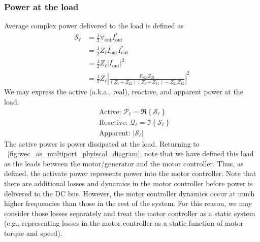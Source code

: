 \documentclass[lettersize,journal]{IEEEtran}
\begin{document}
\subsubsection{Power at the load}\label{sec:power_at_the_load}
Average complex power delivered to the load is defined as 
\begin{equation}
\begin{aligned}
        \mathcal{S}_{\ell} 
        &= \frac{1}{2} \forall_{\textrm{out}} I_{\textrm{out}}^* \\
        &= \frac{1}{2} Z_\ell I_{\textrm{out}} I_{\textrm{out}}^* \\
        &= \frac{1}{2} Z_\ell | I_{\textrm{out}} |^2 \\
        &= \frac{1}{2} Z_\ell \left| \frac{F_{\textrm{exc}} Z_{21}}{ (Z_\ell + Z_{22}) (Z_i + Z_{11}) - Z_{21} Z_{12}  } \right|^2 
\end{aligned}
\end{equation}
%
We may express the active (a.k.a., real), reactive, and apparent power at the load.
%
\begin{subequations}
\begin{align}
        &\textrm{Active: } \mathcal{P}_{\ell} = \Re \left\{ \mathcal{S}_{\ell} \right\} \\[0.5em]
        &\textrm{Reactive: } \mathcal{Q}_{\ell} = \Im \left\{ \mathcal{S}_{\ell} \right\} \\[0.5em]
        &\textrm{Apparent: } | \mathcal{S}_{\ell} |
\end{align}\label{eq:load_power_types}%
\end{subequations}
%
The active power is power dissipated at the load.
Returning to \figurename~\ref{fig:wec_as_multiport_phyiscal_diagram}, note that we have defined this load as the leads between the motor/generator and the motor controller.
Thus, as defined, the activate power represents power into the motor controller.
Note that there are additional losses and dynamics in the motor controller before power is delivered to the DC bus.
However, the motor controller dynamics occur at much higher frequencies than those in the rest of the system.
For this reason, we may consider those losses separately and treat the motor controller as a static system (e.g., representing losses in the motor controller as a static function of motor torque and speed).
\end{document}
